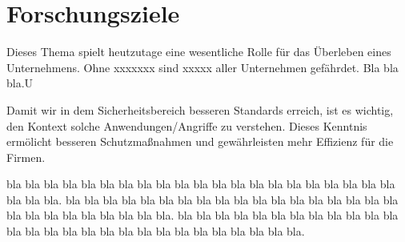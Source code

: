 \section{Forschungsziele}

Dieses Thema spielt heutzutage eine wesentliche Rolle für das Überleben eines Unternehmens. Ohne xxxxxxx sind
xxxxx aller Unternehmen gefährdet. Bla bla bla.U


Damit wir in dem Sicherheitsbereich besseren Standards erreich, ist es wichtig, den Kontext solche Anwendungen/Angriffe zu verstehen.
Dieses Kenntnis ermölicht besseren Schutzmaßnahmen und gewährleisten mehr Effizienz für die Firmen.


bla bla bla bla bla bla bla bla bla bla bla bla bla bla bla bla bla bla bla bla bla bla bla bla.
bla bla bla bla bla bla bla bla bla bla bla bla bla bla bla bla bla bla bla bla bla bla bla bla bla bla bla.
bla bla bla bla bla bla bla bla bla bla bla bla bla bla bla bla bla bla bla bla bla bla bla bla bla bla bla bla.

